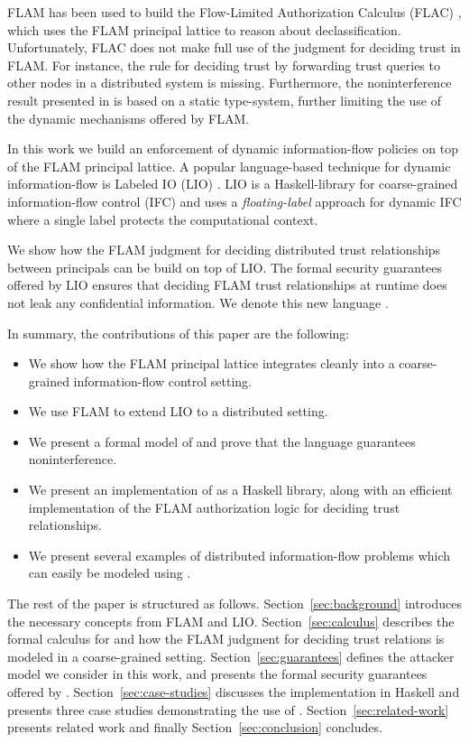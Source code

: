 FLAM has been used to build the Flow-Limited Authorization Calculus (FLAC) \cite{7536372}, which uses the FLAM principal lattice to reason about declassification. Unfortunately, FLAC does not make full use of the judgment for deciding trust in FLAM. For instance, the rule for deciding trust by forwarding trust queries to other nodes in a distributed system is missing. Furthermore, the noninterference result presented in \cite{7536372} is based on a static type-system, further limiting the use of the dynamic mechanisms offered by FLAM.

In this work we build an enforcement of dynamic information-flow policies on top of the FLAM principal lattice. A popular language-based technique for dynamic information-flow is Labeled IO (LIO) \cite{SRMMlio}. LIO is a Haskell-library for coarse-grained information-flow control (IFC) and uses a \emph{floating-label} approach for dynamic IFC where a single label protects the computational context.

We show how the FLAM judgment for deciding distributed trust relationships between principals can be build on top of LIO. The formal security guarantees offered by LIO ensures that deciding FLAM trust relationships at runtime does not leak any confidential information. We denote this new language \lang.

In summary, the contributions of this paper are the following:
\begin{itemize}
    \item We show how the FLAM principal lattice integrates cleanly into a coarse-grained information-flow control setting.
    \item We use FLAM to extend LIO to a distributed setting.
    \item We present a formal model of \lang{} and prove that the language guarantees noninterference.
    \item We present an implementation of \lang{} as a Haskell library, along with an efficient implementation of the FLAM authorization logic for deciding trust relationships.
    \item We present several examples of distributed information-flow problems which can easily be modeled using \lang.
\end{itemize}

The rest of the paper is structured as follows. Section~\ref{sec:background} introduces the necessary concepts from FLAM and LIO. Section~\ref{sec:calculus} describes the formal calculus for \lang{} and how the FLAM judgment for deciding trust relations is modeled in a coarse-grained setting. Section~\ref{sec:guarantees} defines the attacker model we consider in this work, and presents the formal security guarantees offered by \lang. Section~\ref{sec:case-studies} discusses the implementation in Haskell and presents three case studies demonstrating the use of \lang. Section~\ref{sec:related-work} presents related work and finally Section~\ref{sec:conclusion} concludes.